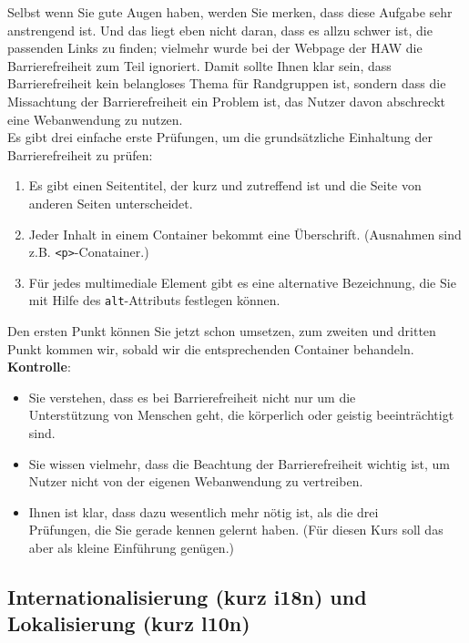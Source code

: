 Selbst wenn Sie gute Augen haben, werden Sie merken, dass diese Aufgabe sehr anstrengend ist. Und das liegt eben nicht daran, dass es allzu schwer ist, die passenden Links zu finden; vielmehr wurde bei der Webpage der HAW die Barrierefreiheit zum Teil ignoriert. Damit sollte Ihnen klar sein, dass Barrierefreiheit kein belangloses Thema für Randgruppen ist, sondern dass die Missachtung der Barrierefreiheit ein Problem ist, das Nutzer davon abschreckt eine Webanwendung zu nutzen.\\

Es gibt drei einfache erste Prüfungen, um die grundsätzliche Einhaltung der Barrierefreiheit zu prüfen:

\begin{enumerate}
	\item Es gibt einen Seitentitel, der kurz und zutreffend ist und die Seite von anderen Seiten unterscheidet.
	\item Jeder Inhalt in einem Container bekommt eine Überschrift. (Ausnahmen sind z.B. \verb|<p>|-Conatainer.)
	\item Für jedes multimediale Element gibt es eine alternative Bezeichnung, die Sie mit Hilfe des \verb|alt|-Attributs festlegen können. 
\end{enumerate}

Den ersten Punkt können Sie jetzt schon umsetzen, zum zweiten und dritten Punkt kommen wir, sobald wir die entsprechenden Container behandeln.\\

\textbf{Kontrolle}:

\begin{itemize}
	\item Sie verstehen, dass es bei Barrierefreiheit nicht nur um die \\Unterstützung von Menschen geht, die körperlich oder geistig beeinträchtigt sind.
	\item Sie wissen vielmehr, dass die Beachtung der Barrierefreiheit wichtig ist, um Nutzer nicht von der eigenen Webanwendung zu vertreiben.
	\item Ihnen ist klar, dass dazu wesentlich mehr nötig ist, als die drei \\Prüfungen, die Sie gerade kennen gelernt haben. (Für diesen Kurs soll das aber als kleine Einführung genügen.)
\end{itemize}

\subsection{Internationalisierung (kurz i18n) und Lokalisierung (kurz l10n)}

